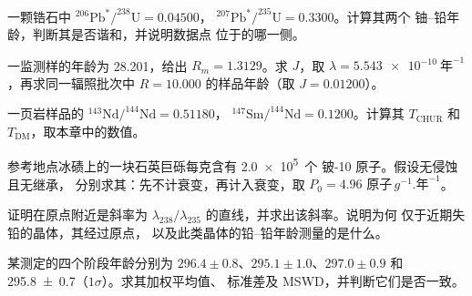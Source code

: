 \begin{exercise}[$\star$]\label{exo:b3:advanced-geochronology:1}
一颗锆石中 $^{206}\mathrm{Pb}^*/^{238}\mathrm{U} = 0.04500$，
$^{207}\mathrm{Pb}^*/^{235}\mathrm{U} = 0.3300$。计算其两个
铀–铅年龄，判断其是否谐和，并说明数据点
位于的哪一侧。
\end{exercise}

\begin{exercise}[$\star$]\label{exo:b3:advanced-geochronology:2}
一监测样的年龄为 \qty{28.201}{\Ma}，给出 $R_m = 1.3129$。求 $J$，取 $\lambda
= \qty{5.543e-10}{\text{年}^{-1}}$，再求同一辐照批次中
$R = 10.000$ 的样品年龄（取 $J = 0.01200$）。
\end{exercise}

\begin{exercise}[$\star$]\label{exo:b3:advanced-geochronology:3}
一页岩样品的 $^{143}\mathrm{Nd}/^{144}\mathrm{Nd} = 0.51180$，
$^{147}\mathrm{Sm}/^{144}\mathrm{Nd} = 0.1200$。计算其 $T_{\mathrm{CHUR}}$
和 $T_{\mathrm{DM}}$，取本章中的数值。
\end{exercise}

\begin{exercise}[$\star$]\label{exo:b3:advanced-geochronology:4}
参考地点冰碛上的一块石英巨砾每克含有 \num{2.0e5}~个
铍-10 原子。假设无侵蚀且无继承，
分别求其：先不计衰变，再计入衰变，取 $P_0 =
\num{4.96}\text{ 原子}\,\unit{g^{-1}.\text{年}^{-1}}$。
\end{exercise}

\begin{exercise}[$\star\star$]\label{exo:b3:advanced-geochronology:5}
证明在原点附近是斜率为
$\lambda_{238}/\lambda_{235}$ 的直线，并求出该斜率。说明为何
仅于近期失铅的晶体，其经过原点，
以及此类晶体的铅–铅年龄测量的是什么。
\end{exercise}

\begin{exercise}[$\star\star$]\label{exo:b3:advanced-geochronology:6}
某测定的四个阶段年龄分别为 $296.4 \pm 0.8$、$295.1 \pm 1.0$、$297.0 \pm
0.9$ 和 \qty[separate-uncertainty=true]{295.8 \pm 0.7}{\Ma}（$1\sigma$）。求其加权平均值、
标准差及 MSWD，并判断它们是否一致。
\end{exercise}

